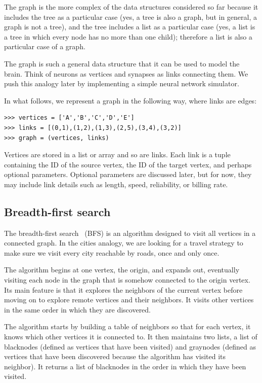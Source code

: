 \documentclass[justified,sixbynine]{tufte-book}
\theoremstyle{plain}%
\theoremstyle{definition}
\theoremstyle{remark}
\begin{document}
\begin{fullwidth}
The graph is the more complex of the data structures considered so far because it includes the tree as a particular case (yes, a tree is also a graph, but in general, a graph is not a tree), and the tree includes a list as a particular case (yes, a list is a tree in which every node has no more than one child); therefore a list is also a particular case of a graph.

The graph is such a general data structure that it can be used to model the brain. Think of neurons as vertices and synapses as links connecting them. We push this analogy later by implementing a simple neural network simulator.

In what follows, we represent a graph in the following way, where links are edges:

\begin{lstlisting}
>>> vertices = ['A','B','C','D','E']
>>> links = [(0,1),(1,2),(1,3),(2,5),(3,4),(3,2)]
>>> graph = (vertices, links)
\end{lstlisting}

Vertices are stored in a list or array and so are links. Each link is a tuple containing the ID of the source vertex, the ID of the target vertex, and perhaps optional parameters.  Optional parameters are discussed later, but for now, they may include link details such as length, speed, reliability, or billing rate.

\subsection{Breadth-first search}


The breadth-first search~\cite{bfs} (BFS) is an algorithm designed to visit all vertices in a connected graph. In the cities analogy, we are looking for a travel strategy to make sure we visit every city reachable by roads, once and only once.

The algorithm begins at one vertex, the origin, and expands out, eventually visiting each node in the graph that is somehow connected to the origin vertex. Its main feature is that it explores the neighbors of the current vertex before moving on to explore remote vertices and their neighbors. It visits other vertices in the same order in which they are discovered.

The algorithm starts by building a table of neighbors so that for each vertex, it knows which other vertices it is connected to. It then maintains two lists, a list of blacknodes (defined as vertices that have been visited) and graynodes (defined as vertices that have been discovered because the algorithm has visited its neighbor). It returns a list of blacknodes in the order in which they have been visited.


\end{fullwidth}
\end{document}
